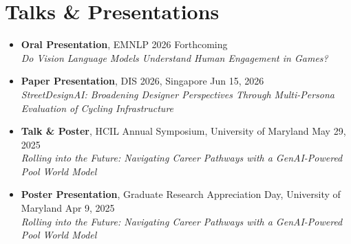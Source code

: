 \section{Talks \& Presentations}
\begin{itemize}[leftmargin=0.15in, label={}]
    \item \small{\textbf{Oral Presentation}, EMNLP 2026 \hfill Forthcoming \\
    \textit{Do Vision Language Models Understand Human Engagement in Games?}}

    \item \small{\textbf{Paper Presentation}, DIS 2026, Singapore \hfill Jun 15, 2026 \\
    \textit{StreetDesignAI: Broadening Designer Perspectives Through Multi-Persona Evaluation of Cycling Infrastructure}}
    
    \item \small{\textbf{Talk \& Poster}, HCIL Annual Symposium, University of Maryland \hfill May 29, 2025 \\
    \textit{Rolling into the Future: Navigating Career Pathways with a GenAI-Powered Pool World Model}}
    
    \item \small{\textbf{Poster Presentation}, Graduate Research Appreciation Day, University of Maryland \hfill Apr 9, 2025 \\
    \textit{Rolling into the Future: Navigating Career Pathways with a GenAI-Powered Pool World Model}}
\end{itemize}
